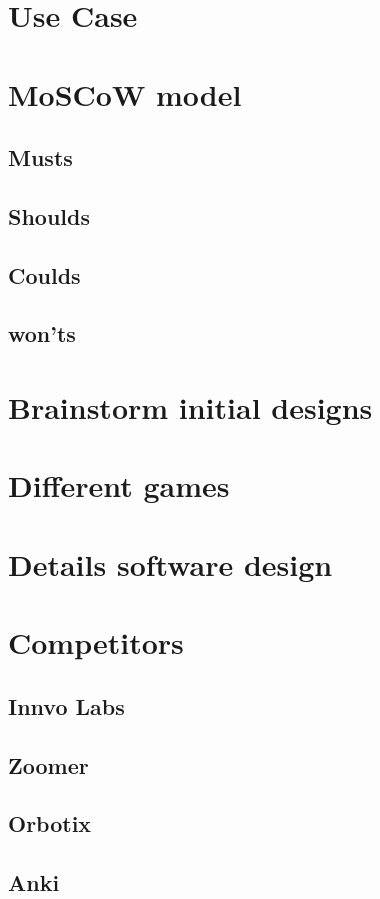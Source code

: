 \documentclass[11pt,twoside,a4paper]{report}
\begin{document}
\begin{appendices}
\chapter{Use Case}
\label{appendix:usecase}
\chapter{MoSCoW model}
\label{appendix:moscow}
\section{Musts}
\section{Shoulds}
\section{Coulds}
\section{won'ts}
\chapter{Brainstorm initial designs}
\label{appendix:brainstorm}
\chapter{Different games}
\label{appendix:games}
\chapter{Details software design}
\label{appendix:software}
\chapter{Competitors}
\label{appendix:competitors}
\section{Innvo Labs}
\section{Zoomer}
\section{Orbotix}
\section{Anki}

\end{appendices}
\end{document}
